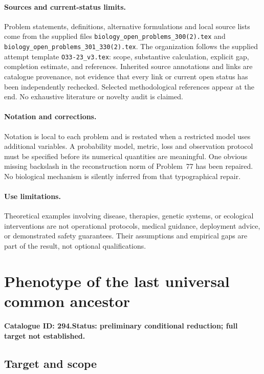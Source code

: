 \documentclass[11pt]{article}
\begin{document}
\paragraph{Sources and current-status limits.}
Problem statements, definitions, alternative formulations and local source lists
come from the supplied files
\texttt{biology\_open\_problems\_300(2).tex} and
\texttt{biology\_open\_problems\_301\_330(2).tex}.
The organization follows the supplied attempt template
\texttt{O33-23\_v3.tex}: scope, substantive calculation, explicit gap,
completion estimate, and references. Inherited source annotations and links are
catalogue provenance, not evidence that every link or current open status has
been independently rechecked. Selected methodological references appear at the
end. No exhaustive literature or novelty audit is claimed.

\paragraph{Notation and corrections.}
Notation is local to each problem and is restated when a restricted model uses
additional variables. A probability model, metric, loss and observation protocol
must be specified before its numerical quantities are meaningful. One obvious
missing backslash in the reconstruction norm of Problem~77 has been repaired.
No biological mechanism is silently inferred from that typographical repair.

\paragraph{Use limitations.}
Theoretical examples involving disease, therapies, genetic systems, or ecological
interventions are not operational protocols, medical guidance, deployment advice,
or demonstrated safety guarantees. Their assumptions and empirical gaps are part
of the result, not optional qualifications.

\setcounter{section}{293}
\section{Phenotype of the last universal common ancestor}
\label{prob:294}
\noindent\textbf{Catalogue ID: 294.}\quad \textbf{Status: preliminary conditional reduction; full target not established.}
\subsection{Target and scope}
\end{document}
